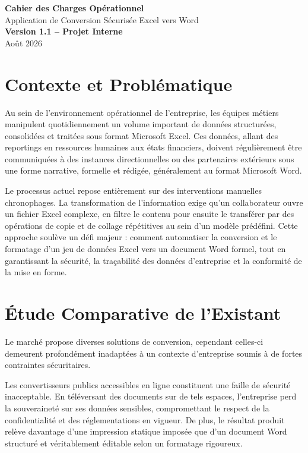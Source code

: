 \documentclass[11pt,a4paper]{article}
\begin{document}
\begin{titlepage}
    \centering
    \vspace*{4cm}
    {\Huge \textbf{\textcolor{primary}{Cahier des Charges Opérationnel}}} \\[1cm]
    {\LARGE Application de Conversion Sécurisée Excel vers Word} \\[2cm]
    {\large \textbf{Version 1.1 -- Projet Interne}} \\[3cm]
    
    \vfill
    {\large Août 2026}
\end{titlepage}

\tableofcontents
\newpage

\section{Contexte et Problématique}
Au sein de l'environnement opérationnel de l'entreprise, les équipes métiers manipulent quotidiennement un volume important de données structurées, consolidées et traitées sous format Microsoft Excel. Ces données, allant des reportings en ressources humaines aux états financiers, doivent régulièrement être communiquées à des instances directionnelles ou des partenaires extérieurs sous une forme narrative, formelle et rédigée, généralement au format Microsoft Word.

Le processus actuel repose entièrement sur des interventions manuelles chronophages. La transformation de l'information exige qu'un collaborateur ouvre un fichier Excel complexe, en filtre le contenu pour ensuite le transférer par des opérations de copie et de collage répétitives au sein d'un modèle prédéfini. Cette approche soulève un défi majeur : comment automatiser la conversion et le formatage d'un jeu de données Excel vers un document Word formel, tout en garantissant la sécurité, la traçabilité des données d'entreprise et la conformité de la mise en forme.

\section{Étude Comparative de l'Existant}
Le marché propose diverses solutions de conversion, cependant celles-ci demeurent profondément inadaptées à un contexte d'entreprise soumis à de fortes contraintes sécuritaires. 

Les convertisseurs publics accessibles en ligne constituent une faille de sécurité inacceptable. En téléversant des documents sur de tels espaces, l'entreprise perd la souveraineté sur ses données sensibles, compromettant le respect de la confidentialité et des réglementations en vigueur. De plus, le résultat produit relève davantage d'une impression statique imposée que d'un document Word structuré et véritablement éditable selon un formatage rigoureux.
\end{document}
